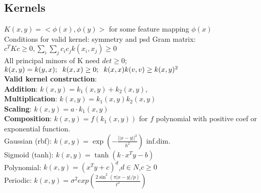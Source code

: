 \subsection*{Kernels}
	$K(x, y) = <\phi(x), \phi(y)>$ for some feature mapping $\phi(x)$\\
	Conditions for valid kernel: symmetry and psd Gram matrix: $c^TKc \geq 0, \sum_i\sum_jc_ic_jk(x_i,x_j)\geq 0$\\
    All principal minors of K need $det \geq 0$;\newline
	$k(x, y) = k(y, x) ;\hspace{2mm} k(x,x) \geq 0;\hspace{2mm} k(x,x)k(v,v) \geq k(x,y)^2$\\
    \textbf{Valid kernel construction}:\\
    \textbf{Addition}: $k(x,y) = k_1(x,y) + k_2(x,y)$,\\
    \textbf{Multiplication}: $k(x,y) = k_1(x,y)k_2(x,y)$\\
    \textbf{Scaling}: $k(x,y) = a\cdot k_1(x,y)$\\
    \textbf{Composition}: $k(x,y) =f(k_1(x,y))$ for $f$ polynomial with positive coef or exponential function.\\
	Gaussian (rbf): $k(x,y) = \exp( -\tfrac{||x-y||^2}{h^2})$ {\tiny inf.dim.}\\
	Sigmoid (tanh): $k(x,y) = \tanh(k\cdot x^Ty - b)$ {\tiny{}} \\
	Polynomial: $k(x,y) {=} (x^Ty {+} c)^d$,$d\in N$,$c\geq0$ \\
	Periodic: $k(x,y) = \sigma ^2 exp(\frac{2\sin ^2 (\pi |x-y|/p)}{\ell ^2})$


